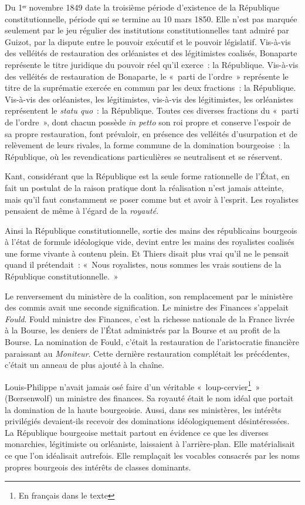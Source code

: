 \documentclass[twoside]{book} %
\begin{document}
Du 1ᵉʳ novembre 1849 date la troisième période d’existence de la République constitutionnelle, période qui se termine au 10 mars 1850. Elle n’est pas marquée seulement par le jeu régulier des institutions constitutionnelles tant admiré par Guizot, par la dispute entre le pouvoir exécutif et le pouvoir législatif. Vis-à-vis des velléités de restauration des orléanistes et des légitimistes coalisés, Bonaparte représente le titre juridique du pouvoir réel qu’il exerce : la République. Vis-à-vis des velléités de restauration de Bonaparte, le « parti de l’ordre » représente le titre de la suprématie exercée en commun par les deux fractions : la République. Vis-à-vis des orléanistes, les légitimistes, vis-à-vis des légitimistes, les orléanistes représentent le \emph{statu quo} : la République. Toutes ces diverses fractions du « parti de l’ordre », dont chacun possède \emph{in petto} son roi propre et conserve l’espoir de sa propre restauration, font prévaloir, en présence des velléités d’usurpation et de relèvement de leurs rivales, la forme commune de la domination bourgeoise : la République, où les revendications particulières se neutralisent et se réservent.\par
Kant, considérant que la République est la seule forme rationnelle de l’État, en fait un postulat de la raison pratique dont la réalisation n’est jamais atteinte, mais qu’il faut constamment se poser comme but et avoir à l’esprit. Les royalistes pensaient de même à l’égard de la \emph{royauté}.\par
Ainsi la République constitutionnelle, sortie des mains des républicains bourgeois à l’état de formule idéologique vide, devint entre les mains des royalistes coalisés une forme vivante à contenu plein. Et Thiers disait plus vrai qu’il ne le pensait quand il prétendait : « Nous royalistes, nous sommes les vrais soutiens de la République constitutionnelle. »\par
Le renversement du ministère de la coalition, son remplacement par le ministère des commis avait une seconde signification. Le ministre des Finances s’appelait \emph{Fould}. Fould ministre des Finances, c’est la richesse nationale de la France livrée à la Bourse, les deniers de l’État administrés par la Bourse et au profit de la Bourse. La nomination de Fould, c’était la restauration de l’aristocratie financière paraissant au \emph{Moniteur}. Cette dernière restauration complétait les précédentes, c’était un anneau de plus ajouté à la chaîne.\par
Louis-Philippe n’avait jamais osé faire d’un véritable « loup-cervier\footnote{En français dans le texte} » (Bœrsenwolf) un ministre des finances. Sa royauté était le nom idéal que portait la domination de la haute bourgeoisie. Aussi, dans ses ministères, les intérêts privilégiés devaient-ils recevoir des dominations idéologiquement désintéressées. La République bourgeoise mettait partout en évidence ce que les diverses monarchies, légitimiste ou orléaniste, laissaient à l’arrière-plan. Elle matérialisait ce que l’on idéalisait autrefois. Elle remplaçait les vocables consacrés par les noms propres bourgeois des intérêts de classes dominants.\par
\end{document}
